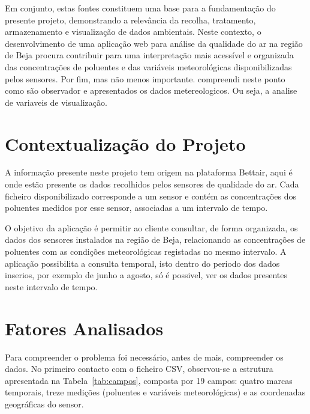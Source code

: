 Em conjunto, estas fontes constituem uma base para a fundamentação do presente projeto, demonstrando a relevância da recolha, tratamento, armazenamento e visualização de dados ambientais. Neste contexto, o desenvolvimento de uma aplicação web para análise da qualidade do ar na região de Beja procura contribuir para uma interpretação mais acessível e organizada das concentrações de poluentes e das variáveis meteorológicas disponibilizadas pelos sensores. Por fim, mas não menos importante. compreendi neste ponto como são observador e apresentados os dados metereologicos. Ou seja, a analise de variaveis de visualização.

\section{Contextualização do Projeto}
\label{sec:contextualizacao}

A informação presente neste projeto tem origem na plataforma Bettair, aqui é onde estão presente os dados recolhidos pelos sensores de qualidade do ar. Cada ficheiro disponibilizado corresponde a um sensor e contém as concentrações dos poluentes medidos por esse sensor, associadas a um intervalo de tempo.

O objetivo da aplicação é permitir ao cliente consultar, de forma organizada, os dados dos sensores instalados na região de Beja, relacionando as concentrações de poluentes com as condições meteorológicas registadas no mesmo intervalo. A aplicação possibilita a consulta temporal, isto dentro do periodo dos dados inserios, por exemplo de junho a agosto, só é possivel, ver os dados presentes neste intervalo de tempo.

\section{Fatores Analisados}

Para compreender o problema foi necessário, antes de mais, compreender os dados. No primeiro contacto com o ficheiro CSV, observou-se a estrutura apresentada na Tabela~\ref{tab:campos}, composta por 19 campos: quatro marcas temporais, treze medições (poluentes e variáveis meteorológicas) e as coordenadas geográficas do sensor.


